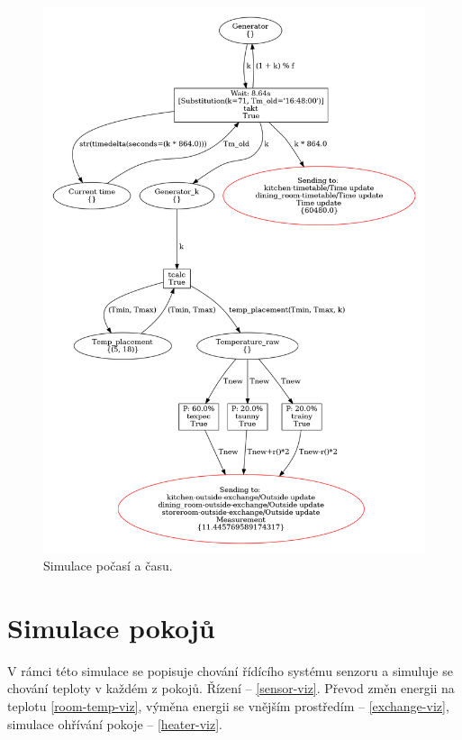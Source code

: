 \begin{figure}[htb]
 \centering
 \includegraphics[width=\textwidth]{obrazky-figures/weather-sim.png}
 \caption{Simulace počasí a času.}
 \label{weather-viz}
\end{figure}

\section{Simulace pokojů}
\label{sec:room-sim-details}

V rámci této simulace se popisuje chování řídícího systému senzoru a simuluje se chování teploty v každém z pokojů. Řízení -- \ref{sensor-viz}. Převod změn energii na teplotu \ref{room-temp-viz}, výměna energii se vnějším prostředím -- \ref{exchange-viz}, simulace ohřívání pokoje -- \ref{heater-viz}.

